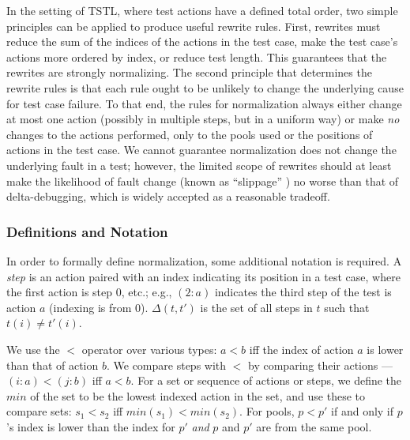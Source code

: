
In the setting of TSTL, where test actions have a defined total
order, two simple principles can be applied to produce useful
rewrite rules.  First, rewrites must reduce the sum of the
indices of the actions in the test case, make the test case's
actions more ordered by index, or reduce test length.  This guarantees that the rewrites are
strongly normalizing.
The second principle that determines the rewrite rules is that each
rule ought to be unlikely to change the underlying cause for test case
failure.  To that end, the rules for normalization always either change at most
one action (possibly in multiple steps, but in a uniform way) or make
\emph{no} changes to the actions performed, only to the pools used or the
positions of actions in the test case.  We cannot guarantee
normalization does not change the underlying fault in a test; however,
the limited scope of rewrites should at least make the likelihood of
fault change (known as ``slippage'' \cite{PLDI13}) no worse than that of
delta-debugging, which is widely accepted as a reasonable tradeoff.

\subsubsection{Definitions and Notation}

In order to formally define normalization, some additional notation is required.
A \emph{step} is an action paired with an index indicating its
position in a test case,
where the first action is step 0, etc.; e.g., $(2: a)$ indicates the
third step of the test is action $a$ (indexing is from 0). 
$\Delta(t,t')$ is the set of all steps in $t$ such that $t(i) \not= t'(i)$.

We use the $<$ operator over various types:
$a < b$ iff the index of action $a$ is lower
than that of action $b$.  We compare steps with $<$ by comparing their
actions --- $(i: a) < (j: b)$ iff $a < b$.  For a set or sequence of actions or steps, we define the $min$ of the
set to be the lowest indexed action in the set, and use
these to compare sets:  $s_1 < s_2$ iff $min(s_1) < min(s_2)$. For pools,
$p < p'$ if and only if $p$'s index is lower than the index for $p'$
\emph{and} $p$ and $p'$ are from the same pool.

